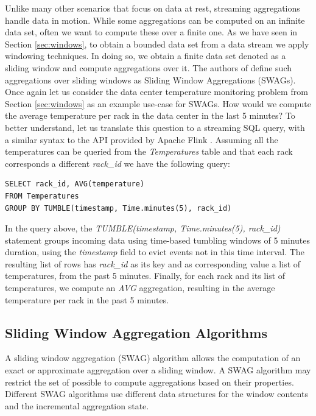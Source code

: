 Unlike many other scenarios that focus on data at rest, streaming aggregations handle data in motion. While some aggregations can be computed on an infinite data set, often we want to compute these over a finite one. As we have seen in Section \ref{sec:windows}, to obtain a bounded data set from a data stream we apply windowing techniques. In doing so, we obtain a finite data set denoted as a sliding window and compute aggregations over it. The authors of \cite{Tangwongsan-Sliding-Window-Aggregation-Algorithms} define such aggregations over sliding windows as Sliding Window Aggregations (SWAGs). Once again let us consider the data center temperature monitoring problem from Section \ref{sec:windows} as an example use-case for SWAGs. How would we compute the average temperature per rack in the data center in the last 5 minutes? To better understand, let us translate this question to a streaming SQL query, with a similar syntax to the API provided by Apache Flink \cite{flink}. Assuming all the temperatures can be queried from the \textit{Temperatures} table and that each rack corresponds a different \textit{rack\_id} we have the following query:

\begin{verbatim}
SELECT rack_id, AVG(temperature)
FROM Temperatures
GROUP BY TUMBLE(timestamp, Time.minutes(5), rack_id)
\end{verbatim}

In the query above, the \textit{TUMBLE(timestamp, Time.minutes(5), rack\_id)} statement groups incoming data using time-based tumbling windows of 5 minutes duration, using the \textit{timestamp} field to evict events not in this time interval. The resulting list of rows has \textit{rack\_id} as its key and as corresponding value a list of temperatures, from the past 5 minutes. Finally, for each rack and its list of temperatures, we compute an \textit{AVG} aggregation, resulting in the average temperature per rack in the past 5 minutes.


\subsection{Sliding Window Aggregation Algorithms} \label{sec:back-swag-algs}

A sliding window aggregation (SWAG) algorithm allows the computation of an exact or approximate aggregation over a sliding window. A SWAG algorithm may restrict the set of possible to compute aggregations based on their properties. Different SWAG algorithms use different data structures for the window contents and the incremental aggregation state.


